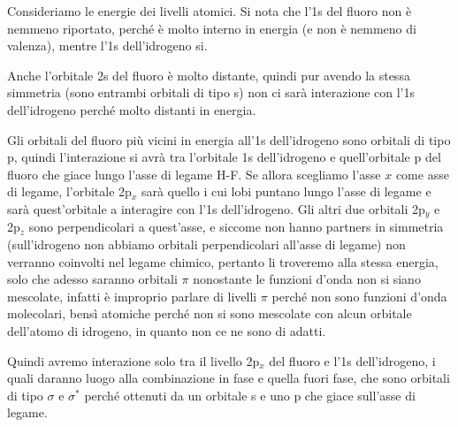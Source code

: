 
Consideriamo le energie dei livelli atomici. Si nota che l'1s del fluoro non è nemmeno riportato, perché è molto interno in energia (e non è nemmeno di valenza), mentre l'1s dell'idrogeno si.

Anche l'orbitale 2s del fluoro è molto distante, quindi pur avendo la stessa simmetria (sono entrambi orbitali di tipo s) non ci sarà interazione con l'1s dell'idrogeno perché molto distanti in energia.

Gli orbitali del fluoro più vicini in energia all'1s dell'idrogeno sono orbitali di tipo p, quindi l'interazione si avrà tra l'orbitale 1s dell'idrogeno e quell'orbitale p del fluoro che giace lungo l'asse di legame H-F. Se allora scegliamo l'asse $x$ come asse di legame, l'orbitale 2p$_x$ sarà quello i cui lobi puntano lungo l'asse di legame e sarà quest'orbitale a interagire con l'1s dell'idrogeno. Gli altri due orbitali 2p$_y$ e 2p$_z$ sono perpendicolari a quest'asse, e siccome non hanno partners in simmetria (sull'idrogeno non abbiamo orbitali perpendicolari all'asse di legame) non verranno coinvolti nel legame chimico, pertanto li troveremo alla stessa energia, solo che adesso saranno orbitali $\pi$ nonostante le funzioni d'onda non si siano mescolate, infatti è improprio parlare di livelli $\pi$ perché non sono funzioni d'onda molecolari, bensì atomiche perché non si sono mescolate con alcun orbitale dell'atomo di idrogeno, in quanto non ce ne sono di adatti.

Quindi avremo interazione solo tra il livello 2p$_x$ del fluoro e l'1s dell'idrogeno, i quali daranno luogo alla combinazione in fase e quella fuori fase, che sono orbitali di tipo $\sigma$ e $\sigma^*$ perché ottenuti da un orbitale s e uno p che giace sull'asse di legame.


